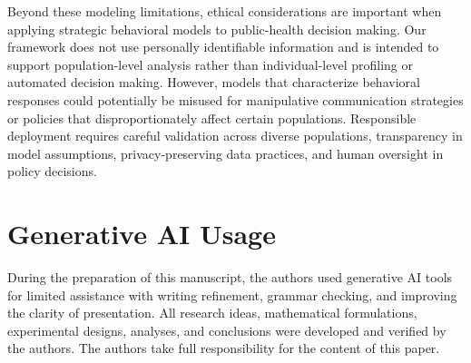 \documentclass[sigconf,review]{acmart}
\begin{document}
Beyond these modeling limitations, ethical considerations are important when applying strategic behavioral models to public-health decision making. Our framework does not use personally identifiable information and is intended to support population-level analysis rather than individual-level profiling or automated decision making. However, models that characterize behavioral responses could potentially be misused for manipulative communication strategies or policies that disproportionately affect certain populations. Responsible deployment requires careful validation across diverse populations, transparency in model assumptions, privacy-preserving data practices, and human oversight in policy decisions.

\section*{Generative AI Usage}

During the preparation of this manuscript, the authors used generative AI tools for limited assistance with writing refinement, grammar checking, and improving the clarity of presentation. All research ideas, mathematical formulations, experimental designs, analyses, and conclusions were developed and verified by the authors. The authors take full responsibility for the content of this paper.


\end{document}
